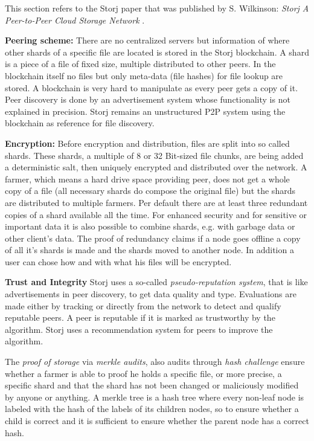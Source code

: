 This section refers to the Storj paper that was published by S. Wilkinson: \textit{Storj A Peer-to-Peer Cloud Storage Network} \cite{storj:PDF}.

\textbf{Peering scheme:} There are no centralized servers but information of where other shards of a specific file are located is stored in the Storj blockchain. A shard is a piece of a file of fixed size, multiple distributed to other peers. In the blockchain itself no files but only meta-data (file hashes) for file lookup are stored. A blockchain is very hard to manipulate as every peer gets a copy of it. Peer discovery is done by an advertisement system whose functionality is not explained in precision. Storj remains an unstructured P2P system using the blockchain as reference for file discovery.

\textbf{Encryption:} Before encryption and distribution, files are split into so called shards. These shards, a multiple of 8 or 32 Bit-sized file chunks, are being added a deterministic salt, then uniquely encrypted and distributed over the network. A farmer, which means a hard drive space providing peer, does not get a whole copy of a file (all necessary shards do compose the original file) but the shards are distributed to multiple farmers. Per default there are at least three redundant copies of a shard available all the time. For enhanced security and for sensitive or important data it is also possible to combine shards, e.g. with garbage data or other client's data. The proof of redundancy claims if a node goes offline a copy of all it's shards is made and the shards moved to another node. In addition a user can chose how and with what his files will be encrypted.

\textbf{Trust and Integrity} Storj uses a so-called \textit{pseudo-reputation system}, that is like advertisements in peer discovery, to get data quality and type. Evaluations are made either by tracking or directly from the network to detect and qualify reputable peers. A peer is reputable if it is marked as trustworthy by the algorithm. Storj uses a recommendation system for peers to improve the algorithm.

The \textit{proof of storage} via \textit{merkle audits}, also audits through \textit{hash challenge} ensure whether a farmer is able to proof he holds a specific file, or more precise, a specific shard and that the shard has not been changed or maliciously modified by anyone or anything. A merkle tree is a hash tree where every non-leaf node is labeled with the hash of the labels of its children nodes, so to ensure whether a child is correct and it is sufficient to ensure whether the parent node has a correct hash.

